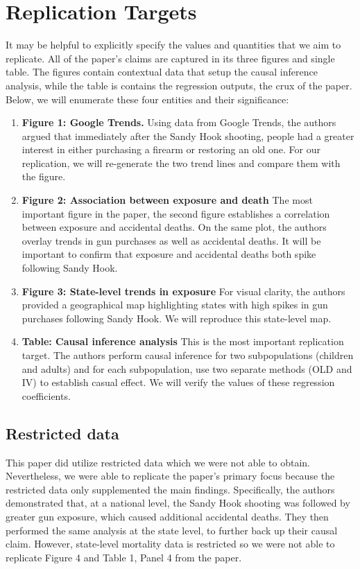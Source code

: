 \documentclass[12pt]{article}%
\begin{document}
\section*{Replication Targets}
It may be helpful to explicitly specify the values and quantities that we aim to replicate. All of the paper's claims are captured in its three figures and single table. The figures contain contextual data that setup the causal inference analysis, while the table is contains the regression outputs, the crux of the paper. Below, we will enumerate these four entities and their significance: 
\begin{enumerate}
	\item \textbf{Figure 1: Google Trends.} Using data from Google Trends, the authors argued that immediately after the Sandy Hook shooting, people had a greater interest in either purchasing a firearm or restoring an old one. For our replication, we will re-generate the two trend lines and compare them with the figure. \\
	\item \textbf{Figure 2: Association between exposure and death} The most important figure in the paper, the second figure establishes a correlation between exposure and accidental deaths. On the same plot, the authors overlay trends in gun purchases as well as accidental deaths. It will be important to confirm that exposure and accidental deaths both spike following Sandy Hook. \\
	\item \textbf{Figure 3: State-level trends in exposure} For visual clarity, the authors provided a geographical map highlighting states with high spikes in gun purchases following Sandy Hook. We will reproduce this state-level map.\\
	\item \textbf{Table: Causal inference analysis} This is the most important replication target. The authors perform causal inference for two subpopulations (children and adults) and for each subpopulation, use two separate methods (OLD and IV) to establish casual effect. We will verify the values of these regression coefficients.\\
\end{enumerate}
\subsection*{Restricted data}
This paper did utilize restricted data which we were not able to obtain. Nevertheless, we were able to replicate the paper's primary focus because the restricted data only supplemented the main findings. Specifically, the authors demonstrated that, at a national level, the Sandy Hook shooting was followed by greater gun exposure, which caused additional accidental deaths. They then performed the same analysis at the state level, to further back up their causal claim. However, state-level mortality data is restricted so we were not able to replicate Figure 4 and Table 1, Panel 4 from the paper.  
\end{document}
